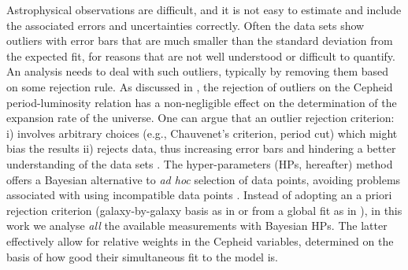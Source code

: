 Astrophysical observations are difficult, and it is not easy to estimate and include the associated errors and uncertainties correctly. Often the data sets show outliers with error bars that are much smaller than the standard deviation from the expected fit, for reasons that are not well understood or difficult to quantify. An analysis needs to deal with such outliers, typically by removing them based on some rejection rule.
As discussed in \cite{Riess:2009pu,Riess:2011yx,Efstathiou:2013via}, the rejection of outliers on the Cepheid period-luminosity relation has a non-negligible effect on the determination of the expansion rate of the universe. One can argue that an outlier rejection criterion: i) involves arbitrary choices (e.g., Chauvenet's criterion, period cut) which might bias the results ii) rejects data, thus increasing error bars and hindering a better understanding of the data sets \cite{Press:1996fw}. The hyper-parameters (HPs, hereafter) method offers a Bayesian alternative to {\em{ad hoc}} selection of data points, avoiding problems associated with using incompatible data points \cite{Lahav:1999hu}. Instead of adopting an a priori rejection criterion  (galaxy-by-galaxy basis as in \cite{Riess:2009pu,Riess:2011yx} or from a global fit as in \cite{Efstathiou:2013via}), in this work we analyse {\em all} the available measurements with Bayesian HPs. The latter effectively allow for relative weights in the Cepheid variables, determined on the basis of how good their simultaneous fit to the model is. 

